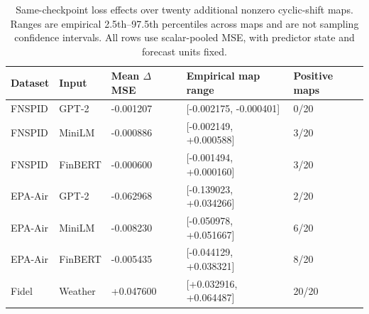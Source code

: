 \begin{table}[htbp]
\centering\small
\caption{Same-checkpoint loss effects over twenty additional nonzero cyclic-shift maps. Ranges are empirical 2.5th--97.5th percentiles across maps and are not sampling confidence intervals. All rows use scalar-pooled MSE, with predictor state and forecast units fixed.}
\label{tab:maps}
\begin{tabular}{lllll}
\toprule
Dataset & Input & Mean $\Delta$ MSE & Empirical map range & Positive maps\\
\midrule
FNSPID & GPT-2 & -0.001207 & [-0.002175, -0.000401] & 0/20\\
FNSPID & MiniLM & -0.000886 & [-0.002149, +0.000588] & 3/20\\
FNSPID & FinBERT & -0.000600 & [-0.001494, +0.000160] & 3/20\\
EPA-Air & GPT-2 & -0.062968 & [-0.139023, +0.034266] & 2/20\\
EPA-Air & MiniLM & -0.008230 & [-0.050978, +0.051667] & 6/20\\
EPA-Air & FinBERT & -0.005435 & [-0.044129, +0.038321] & 8/20\\
Fidel & Weather & +0.047600 & [+0.032916, +0.064487] & 20/20\\
\bottomrule
\end{tabular}
\end{table}
